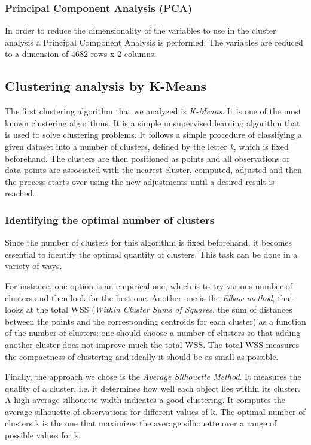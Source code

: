 \documentclass[a4paper,11pt,dvipsnames]{article}
\begin{document}
\subsubsection{Principal Component Analysis (PCA)}

In order to reduce the dimensionality of the variables to use in the cluster analysis a Principal Component Analysis is performed. The variables are reduced to a dimension of 4682 rows x 2 columns.

\subsection{Clustering analysis by K-Means}
The first clustering algorithm that we analyzed is \textit{K-Means}. It is one of the most known clustering algorithms. It is a simple unsupervised learning algorithm that is used to solve clustering problems. It follows a simple procedure of classifying a given dataset into a number of clusters, defined by the letter \textit{k}, which is fixed beforehand. The clusters are then positioned as points and all observations or data points are associated with the nearest cluster, computed, adjusted and then the process starts over using the new adjustments until a desired result is reached.

\subsubsection{Identifying the optimal number of clusters}
Since the number of clusters for this algorithm is fixed beforehand, it becomes essential to identify the optimal quantity of clusters. This task can be done in a variety of ways.

For instance, one option is an empirical one, which is to try various number of clusters and then look for the best one. Another one is the \textit{Elbow method}, that looks at the total WSS (\textit{Within Cluster Sums of Squares}, the sum of distances between the points and the corresponding centroids for each cluster) as a function of the number of clusters: one should choose a number of clusters so that adding another cluster does not improve much the total WSS. The total WSS measures the compactness of clustering and ideally it should be as small as possible. 

Finally, the approach we chose is the \textit{Average Silhouette Method}. It measures the quality of a cluster, i.e. it determines how well each object lies within its cluster. A high average silhouette width indicates a good clustering. It computes the average silhouette of observations for different values of k. The optimal number of clusters k is the one that maximizes the average silhouette over a range of possible values for k\cite{books/wi/KaufmanR90}.
\end{document}

